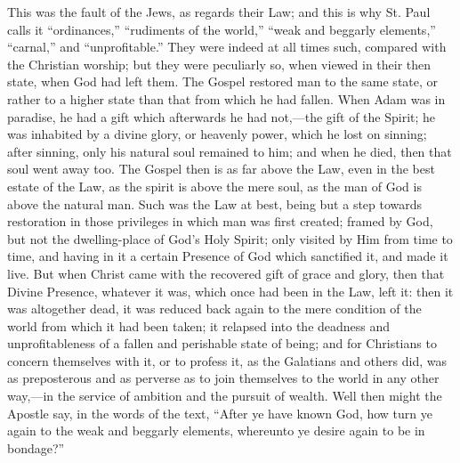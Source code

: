 This was the fault of the Jews, as regards their Law; and this is
why St. Paul calls it ``ordinances,'' ``rudiments of the
world,'' ``weak and beggarly elements,''
``carnal,'' and ``unprofitable.'' They were indeed at
all times such, compared with the Christian worship; but they were
peculiarly so, when viewed in their then state, when God had left
them. The Gospel restored man to the same state, or rather to a higher
state than that from which he had fallen. When Adam was in paradise,
he had a gift which afterwards he had not,—the gift of the Spirit;
he was inhabited by a divine glory, or heavenly power, which he lost
on sinning; after sinning, only his natural soul remained to him; and
when he died, then that soul went away too. The Gospel then is as far
above the Law, even in the best estate of the Law, as the spirit is
above the mere soul, as the man of God is above the natural man. Such
was the Law at best, being but a step towards restoration in those
privileges in which man was first created; framed by God, but not
the
dwelling-place of God's Holy Spirit; only visited by Him from time to
time, and having in it a certain Presence of God which sanctified it,
and made it live. But when Christ came with the recovered gift of
grace and glory, then that Divine Presence, whatever it was, which
once had been in the Law, left it: then it was altogether dead, it was
reduced back again to the mere condition of the world from which it
had been taken; it relapsed into the deadness and unprofitableness of
a fallen and perishable state of being; and for Christians to concern
themselves with it, or to profess it, as the Galatians and others did,
was as preposterous and as perverse as to join themselves to the world
in any other way,—in the service of ambition and the pursuit of
wealth. Well then might the Apostle say, in the words of the text,
``After ye have known God, how turn ye again to the weak and
beggarly elements, whereunto ye desire again to be in bondage?''

